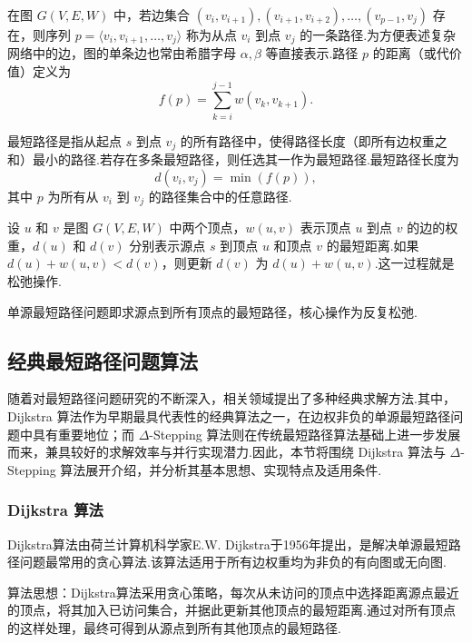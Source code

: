 \begin{definition}
在图 $G(V, E, W)$ 中，若边集合 $(v_i, v_{i+1}), (v_{i+1}, v_{i+2}), \ldots, (v_{p-1}, v_j)$ 存在，则序列 $p = \langle v_i, v_{i+1}, \ldots, v_j \rangle$ 称为从点 $v_i$ 到点 $v_j$ 的一条路径.为方便表述复杂网络中的边，图的单条边也常由希腊字母 $\alpha, \beta$ 等直接表示.路径 $p$ 的距离（或代价值）定义为
\[
f(p) = \sum_{k=i}^{j-1} w(v_k, v_{k+1}).
\]
\end{definition}

\begin{definition}
最短路径是指从起点 $s$ 到点 $v_j$ 的所有路径中，使得路径长度（即所有边权重之和）最小的路径.若存在多条最短路径，则任选其一作为最短路径.最短路径长度为
\[
d(v_i, v_j) = \min(f(p)),
\]
其中 $p$ 为所有从 $v_i$ 到 $v_j$ 的路径集合中的任意路径.
\end{definition}

\begin{definition}
设 $u$ 和 $v$ 是图 $G(V, E, W)$ 中两个顶点，$w(u,v)$ 表示顶点 $u$ 到点 $v$ 的边的权重，$d(u)$ 和 $d(v)$ 分别表示源点 $s$ 到顶点 $u$ 和顶点 $v$ 的最短距离.如果 $d(u) + w(u,v) < d(v)$，则更新 $d(v)$ 为 $d(u) + w(u,v)$.这一过程就是松弛操作.
\end{definition}

单源最短路径问题即求源点到所有顶点的最短路径，核心操作为反复松弛.

\subsection{经典最短路径问题算法}

随着对最短路径问题研究的不断深入，相关领域提出了多种经典求解方法.其中，Dijkstra 算法作为早期最具代表性的经典算法之一，在边权非负的单源最短路径问题中具有重要地位；而 $\Delta$-Stepping 算法则在传统最短路径算法基础上进一步发展而来，兼具较好的求解效率与并行实现潜力.因此，本节将围绕 Dijkstra 算法与 $\Delta$-Stepping 算法展开介绍，并分析其基本思想、实现特点及适用条件.

\subsubsection{Dijkstra 算法}

Dijkstra算法由荷兰计算机科学家E.W. Dijkstra于1956年提出，是解决单源最短路径问题最常用的贪心算法.该算法适用于所有边权重均为非负的有向图或无向图.


算法思想：Dijkstra算法采用贪心策略，每次从未访问的顶点中选择距离源点最近的顶点，将其加入已访问集合，并据此更新其他顶点的最短距离.通过对所有顶点的这样处理，最终可得到从源点到所有其他顶点的最短路径.


